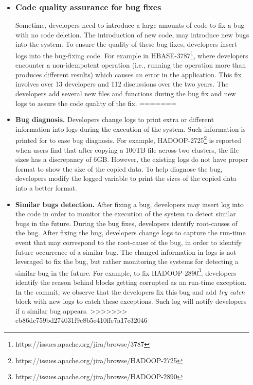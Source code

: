 \begin{itemize}
\item \subsubsection*{Code quality assurance for bug fixes} Sometime, developers need to introduce a large amounts of code to fix a bug with no code deletion. The introduction of new code, may introduce new bugs into the system. To ensure the quality of these bug fixes, developers insert logs into the bug-fixing code. For example in HBASE-3787\footnote{https://issues.apache.org/jira/browse/3787}, where developers encounter a non-idempotent operation (i.e., running the operation more than produces different results) which causes an error in the application. This fix involves over 13 developers and 112 discussions over the two years. The developers add several new files and functions during the bug fix and new logs to assure the code quality of the fix. 
=======
\item \textbf{Bug diagnosis.} Developers change logs to print extra or different information into logs during the execution of the system. Such information is printed for to ease bug diagnosis.
For example, HADOOP-2725\footnote{https://issues.apache.org/jira/browse/HADOOP-2725} is reported when users find that after copying a 100TB file across two clusters, the file sizes has a discrepancy of 6GB. However, the existing logs do not have proper format to show the size of the copied data. To help diagnose the bug, developers modify the logged variable to print the sizes of the copied data into a better format. %


\item \textbf{Similar bugs detection.} After fixing a bug, developers may insert log into the code in order to monitor the execution of the system to detect similar bugs in the future. During the bug fixes, developers identify root-causes of the bug. After fixing the bug, developers change logs to capture the run-time event that may correspond to the root-cause of the bug, in order to identify future occurrence of a similar bug. The changed information in logs is not leveraged to fix the bug, but rather monitoring the systems for detecting a similar bug in the future.
For example, to fix HADOOP-2890\footnote{https://issues.apache.org/jira/browse/HADOOP-2890}, developers identify the reason behind blocks getting corrupted as an run-time exception. In the commit, we observe that the developers fix this bug and add \textsl{try catch} block with new logs to catch these exceptions. Such log will notify developers if a similar bug appears.
>>>>>>> eb86de759bd274031f9c8b5e410ffe7a17c32046


\end{itemize}
